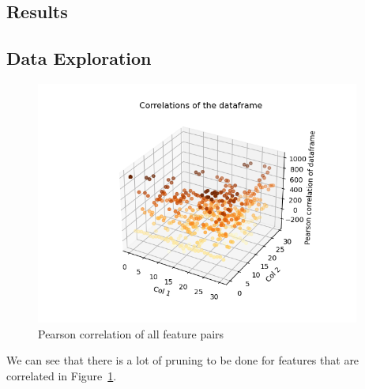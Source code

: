 \documentclass[12pt, a4paper]{article}
\begin{document}
\begin{multicols}{2}
    \section{Results} \label{sec:res}

    \subsection{Data Exploration} \label{subsec:expl}

\end{multicols}

    \begin{figure}[H]
        \begin{center}
            \includegraphics[width=0.95\textwidth]{figures/Correlations of the dataframe.png}
        \end{center}
        \caption{Pearson correlation of all feature pairs}\label{fig:corr}
    \end{figure}

\begin{multicols}{2}

    We can see that there is a lot of pruning to be done for features that are correlated in Figure~\ref{fig:corr}.
    \newline

\end{multicols}
\end{document}
